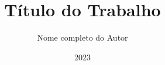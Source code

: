 \documentclass[ptcc]{ifbclass/ifbclass}
\title{Título do Trabalho}
\date{2023}
\author{Nome completo do Autor}
\begin{document}
\frontpage

\listoffigures

\listoftables

\listofacronyms


\tableofcontents

\mainmatter






\begin{references}
  
\end{references}
\end{document}
